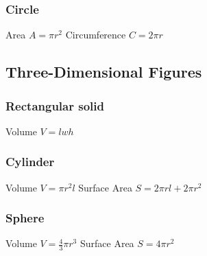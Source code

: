 \documentclass[11pt]{article}
\begin{document}
    \subsubsection{Circle}
    Area $A = \pi r^{2}$\newline
    Circumference $C = 2\pi r$
    \subsection{Three-Dimensional Figures}
    \subsubsection{Rectangular solid}
    Volume $V = lwh$
    \subsubsection{Cylinder}
    Volume $V = \pi r^{2}l$\newline
    Surface Area $S = 2\pi rl + 2\pi r^{2}$
    \subsubsection{Sphere}
    Volume $V = \frac{4}{3}\pi r^{3}$\newline
    Surface Area $S = 4 \pi r^{2}$
\end{document}
